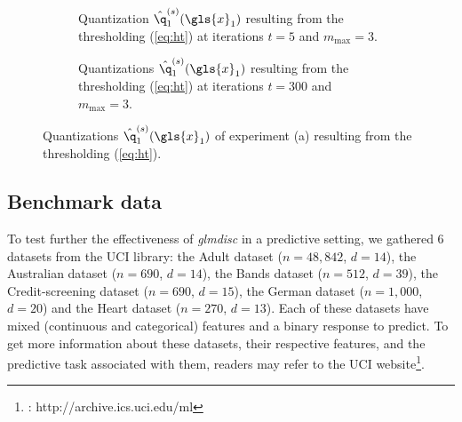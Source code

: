  \newlength\figureheight
 \newlength\figurewidth
 \setlength\figureheight{4cm}
 \setlength\figurewidth{14cm}
 
  \begin{figure}[!ht]
    \centering
    \begin{subfigure}[t]{\textwidth}
        \centering
        
        \vspace{-0.5cm}
        \caption{Quantization $\hat{\q}^{(s)}_1(\gls{x}_1)$ resulting from the thresholding (\ref{eq:ht}) at iterations $t = 5$ and $m_{\text{max}} = 3$.}
    \end{subfigure}%
    
    \begin{subfigure}[t]{\textwidth}
        \centering
        
        \vspace{-0.5cm}
        \caption{Quantizations $\hat{\q}^{(s)}_1(\gls{x}_1)$ resulting from the thresholding (\ref{eq:ht}) at iterations $t = 300$ and $m_{\text{max}} = 3$.}
    \end{subfigure}
    
    \caption{\label{fig:MAP} Quantizations $\hat{\q}^{(s)}_1(\gls{x}_1)$ of experiment (a) resulting from the thresholding (\ref{eq:ht}).}
\end{figure}

\subsection{Benchmark data} \label{subsec:exp_benchmark}

To test further the effectiveness of \textit{glmdisc} in a predictive setting, we gathered 6 datasets from the UCI library: the Adult dataset ($n=48,842$, $d=14$), the Australian dataset ($n=690$, $d=14$), the Bands dataset ($n=512$, $d=39$), the Credit-screening dataset ($n=690$, $d=15$), the German dataset ($n=1,000$, $d=20$) and the Heart dataset ($n=270$, $d=13$). Each of these datasets have mixed (continuous and categorical) features and a binary response to predict. To get more information about these datasets, their respective features, and the predictive task associated with them, readers may refer to the UCI website\footnote{\cite{Dua:2017} : http://archive.ics.uci.edu/ml}.

